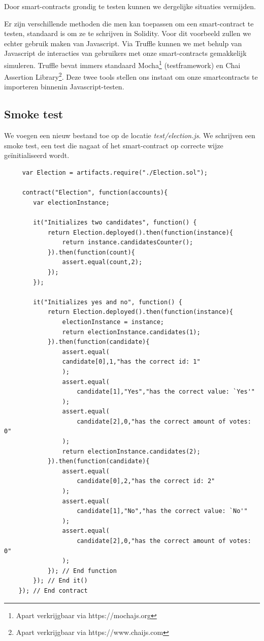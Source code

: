 	Door smart-contracts grondig te testen kunnen we dergelijke situaties vermijden.
	
	Er zijn verschillende methoden die men kan toepassen om een smart-contract te testen, standaard is om ze te schrijven in Solidity. Voor dit voorbeeld zullen we echter gebruik maken van Javascript. Via Truffle kunnen we met behulp van Javascript de  interacties van gebruikers met onze smart-contracts gemakkelijk simuleren. Truffle bevat immers standaard Mocha\footnote{Apart verkrijgbaar via https://mochajs.org} (testframework) en Chai Assertion Library\footnote{Apart verkrijgbaar via https://www.chaijs.com}. Deze twee tools stellen ons instaat om onze smartcontracts te importeren binnenin Javascript-testen. 
	
	\subsection{Smoke  test}
	We voegen een nieuw bestand toe op de locatie \textit{test\slash election.js}. We schrijven een smoke test, een test die nagaat of het smart-contract op correcte wijze geïnitialiseerd wordt.

	 \lstset{language=JavaScriptSolidity} 
	 \begin{lstlisting}
	 var Election = artifacts.require("./Election.sol");
	 	
	 contract("Election", function(accounts){
		var electionInstance;
		 
		it("Initializes two candidates", function() {
		 	return Election.deployed().then(function(instance){
		 		return instance.candidatesCounter();
		 	}).then(function(count){
		 		assert.equal(count,2);
		 	});
	 	});
	 	
		it("Initializes yes and no", function() {
	 		return Election.deployed().then(function(instance){
	 			electionInstance = instance;
	 			return electionInstance.candidates(1);
	 		}).then(function(candidate){
				assert.equal(
			 	candidate[0],1,"has the correct id: 1"
			 	);
				assert.equal(
				 	candidate[1],"Yes","has the correct value: `Yes'"
				);
				assert.equal(
				 	candidate[2],0,"has the correct amount of votes: 0"
				);
				return electionInstance.candidates(2);
	 		}).then(function(candidate){
				assert.equal(
					candidate[0],2,"has the correct id: 2"
				);
				assert.equal(
					candidate[1],"No","has the correct value: `No'"
				);
				assert.equal(
					candidate[2],0,"has the correct amount of votes: 0"
				);				
	 		}); // End function
	 	}); // End it()
	}); // End contract
	\end{lstlisting}
	
